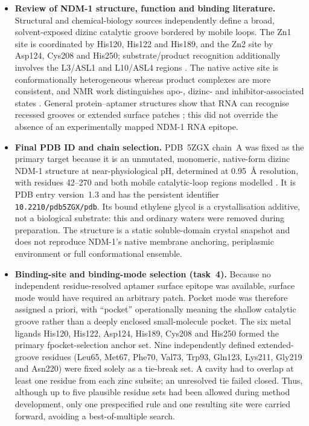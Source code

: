 \begin{itemize}
  \item \textbf{Review of NDM-1 structure, function and binding literature.}
  Structural and chemical-biology sources independently define a broad,
  solvent-exposed dizinc catalytic groove bordered by mobile loops.  The Zn1
  site is coordinated by His120, His122 and His189, and the Zn2 site by Asp124,
  Cys208 and His250; substrate/product recognition additionally involves the
  L3/ASL1 and L10/ASL4 regions
  \cite{kim_structure_2011,king_ndm1_2013,zhang_active-site_2018}.  The native
  active site is conformationally heterogeneous whereas product complexes are
  more consistent, and NMR work distinguishes apo-, dizinc- and
  inhibitor-associated states \cite{zhang_active-site_2018,cheng_distinct_2023}.
  General protein--aptamer structures show that RNA can recognise recessed
  grooves or extended surface patches \cite{gelinas_embracing_2016}; this did
  not override the absence of an experimentally mapped NDM-1 RNA epitope.

  \item \textbf{Final PDB ID and chain selection.}  PDB~5ZGX chain~A was fixed
  as the primary target because it is an unmutated, monomeric, native-form
  dizinc NDM-1 structure at near-physiological pH, determined at 0.95~\AA{}
  resolution, with residues 42--270 and both mobile catalytic-loop regions
  modelled \cite{zhang_active-site_2018}.  It is PDB entry version~1.3 and has
  the persistent identifier \texttt{10.2210/pdb5ZGX/pdb}.  Its bound ethylene
  glycol is a crystallisation additive, not a biological substrate: this and
  ordinary waters were removed during preparation.  The structure is a static
  soluble-domain crystal snapshot and does not reproduce NDM-1's native
  membrane anchoring, periplasmic environment or full conformational ensemble.

  \item \textbf{Binding-site and binding-mode selection (task~4).}  Because no
  independent residue-resolved aptamer surface epitope was available, surface
  mode would have required an arbitrary patch.  Pocket mode was therefore
  assigned a priori, with ``pocket'' operationally meaning the shallow catalytic
  groove rather than a deeply enclosed small-molecule pocket.  The six metal
  ligands His120, His122, Asp124, His189, Cys208 and His250 formed the primary
  fpocket-selection anchor set.  Nine independently defined extended-groove
  residues (Leu65, Met67, Phe70, Val73, Trp93, Gln123, Lys211, Gly219 and
  Asn220) were fixed solely as a tie-break set.  A cavity had to overlap at
  least one residue from each zinc subsite; an unresolved tie failed closed.
  Thus, although up to five plausible residue sets had been allowed during
  method development, only one prespecified rule and one resulting site were
  carried forward, avoiding a best-of-multiple search.


\end{itemize}
